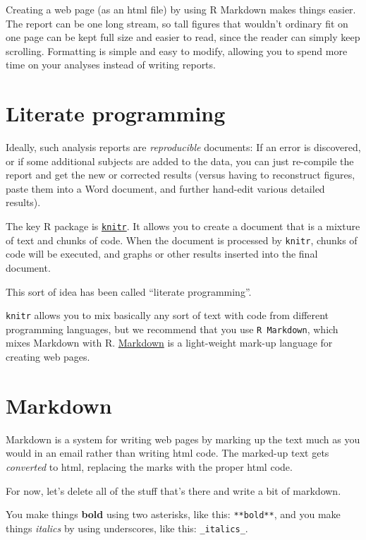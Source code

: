 \documentclass[]{book}
\begin{document}
Creating a web page (as an html file) by using R Markdown makes things
easier. The report can be one long stream, so tall figures that wouldn't
ordinary fit on one page can be kept full size and easier to read, since
the reader can simply keep scrolling. Formatting is simple and easy to
modify, allowing you to spend more time on your analyses instead of
writing reports.

\section{Literate programming}\label{literate-programming}

Ideally, such analysis reports are \emph{reproducible} documents: If an
error is discovered, or if some additional subjects are added to the
data, you can just re-compile the report and get the new or corrected
results (versus having to reconstruct figures, paste them into a Word
document, and further hand-edit various detailed results).

The key R package is \href{http://yihui.name/knitr/}{\texttt{knitr}}. It
allows you to create a document that is a mixture of text and chunks of
code. When the document is processed by \texttt{knitr}, chunks of code
will be executed, and graphs or other results inserted into the final
document.

This sort of idea has been called ``literate programming''.

\texttt{knitr} allows you to mix basically any sort of text with code
from different programming languages, but we recommend that you use
\texttt{R\ Markdown}, which mixes Markdown with R.
\href{https://www.markdownguide.org/}{Markdown} is a light-weight
mark-up language for creating web pages.

\section{Markdown}\label{markdown}

Markdown is a system for writing web pages by marking up the text much
as you would in an email rather than writing html code. The marked-up
text gets \emph{converted} to html, replacing the marks with the proper
html code.

For now, let's delete all of the stuff that's there and write a bit of
markdown.

You make things \textbf{bold} using two asterisks, like this:
\texttt{**bold**}, and you make things \emph{italics} by using
underscores, like this: \texttt{\_italics\_}.
\end{document}
